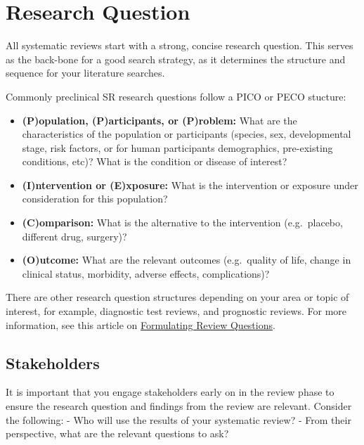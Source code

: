 \documentclass[
]{book}
\providecommand{\tightlist}{%
  \setlength{\itemsep}{0pt}\setlength{\parskip}{0pt}}
\begin{document}
\hypertarget{researchquestion}{%
\chapter{Research Question}\label{researchquestion}}

All systematic reviews start with a strong, concise research question. This serves as the back-bone for a good search strategy, as it determines the structure and sequence for your literature searches.

Commonly preclinical SR research questions follow a PICO or PECO stucture:

\begin{itemize}
\tightlist
\item
  \textbf{(P)opulation, (P)articipants, or (P)roblem:} What are the characteristics of the population or participants (species, sex, developmental stage, risk factors, or for human participants demographics, pre-existing conditions, etc)? What is the condition or disease of interest?
\item
  \textbf{(I)ntervention or (E)xposure:} What is the intervention or exposure under consideration for this population?
\item
  \textbf{(C)omparison:} What is the alternative to the intervention (e.g.~placebo, different drug, surgery)?
\item
  \textbf{(O)utcome:} What are the relevant outcomes (e.g.~quality of life, change in clinical status, morbidity, adverse effects, complications)?
\end{itemize}

There are other research question structures depending on your area or topic of interest, for example, diagnostic test reviews, and prognostic reviews.
For more information, see this article on \href{https://journals.library.ualberta.ca/eblip/index.php/EBLIP/article/view/9741/8144}{Formulating Review Questions}.

\hypertarget{stakeholders}{%
\section{Stakeholders}\label{stakeholders}}

It is important that you engage stakeholders early on in the review phase to ensure the research question and findings from the review are relevant. Consider the following:
- Who will use the results of your systematic review?
- From their perspective, what are the relevant questions to ask?
\end{document}
